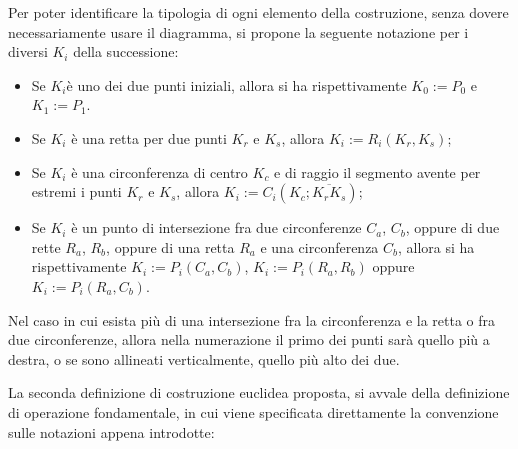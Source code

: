 \begin{osservazione}
Per poter identificare la tipologia di ogni elemento della costruzione, senza dovere necessariamente usare il diagramma, si propone la seguente notazione per i diversi $K_{i}$ della successione: 
\begin{itemize}

\item Se $K_{i}$è uno dei due punti iniziali, allora si ha rispettivamente $K_{0} := P_{0}$ e $K_{1} := P_{1}$.

\item Se $K_{i}$ è una retta per due punti $K_{r}$ e $K_{s}$, allora $K_{i} := R_{i} (K_{r}, K_{s})$;

\item Se $K_{i}$ è una circonferenza di centro $K_{c}$ e di raggio il segmento avente per estremi i punti $K_{r}$ e $K_{s}$, allora $K_{i} := C_{i} (K_{c}; \overline{K_{r}K_{s}})$;

\item Se $K_{i}$ è un punto di intersezione fra due circonferenze $C_{a}$, $C_{b}$, oppure di due rette $R_{a}$, $R_{b}$, oppure di una retta $R_{a}$ e una circonferenza $C_{b}$, allora si ha rispettivamente $K_{i} := P_{i} (C_{a},C_{b})$, $K_{i} := P_{i} (R_{a},R_{b})$ oppure $K_{i} := P_{i} (R_{a},C_{b})$.
\end{itemize}

Nel caso in cui esista più di una intersezione fra la circonferenza e la retta o fra due circonferenze, allora nella numerazione il primo dei punti sarà quello più a destra, o se sono allineati verticalmente, quello più alto dei due.
\end{osservazione}

\noindent
La seconda definizione di costruzione euclidea proposta, si avvale della definizione di operazione fondamentale, in cui viene specificata direttamente la convenzione sulle notazioni appena introdotte:

